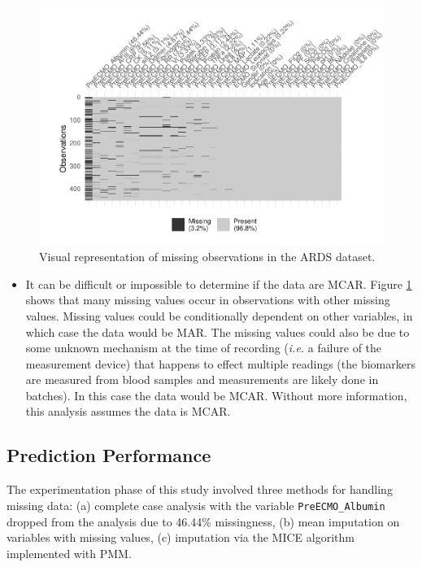 \documentclass[12pt,]{article}
\providecommand{\tightlist}{%
  \setlength{\itemsep}{0pt}\setlength{\parskip}{0pt}}
\begin{document}
\begin{figure}[H]

{\centering \includegraphics[width=1\linewidth]{figure/graphics-missing-data-1} 

}

\caption{\label{fig:missing-data}Visual representation of missing observations in the ARDS dataset.}\label{fig:missing-data}
\end{figure}

\begin{itemize}
\tightlist
\item
  It can be difficult or impossible to determine if the data are MCAR.
  Figure \ref{fig:missing-data} shows that many missing values occur in
  observations with other missing values. Missing values could be
  conditionally dependent on other variables, in which case the data
  would be MAR. The missing values could also be due to some unknown
  mechanism at the time of recording (\emph{i.e.} a failure of the
  measurement device) that happens to effect multiple readings (the
  biomarkers are measured from blood samples and measurements are likely
  done in batches). In this case the data would be MCAR. Without more
  information, this analysis assumes the data is MCAR.
\end{itemize}

\subsection{Prediction Performance}\label{prediction-performance}

The experimentation phase of this study involved three methods for
handling missing data: (a) complete case analysis with the variable
\texttt{PreECMO\_Albumin} dropped from the analysis due to 46.44\%
missingness, (b) mean imputation on variables with missing values, (c)
imputation via the MICE algorithm implemented with PMM.
\end{document}
